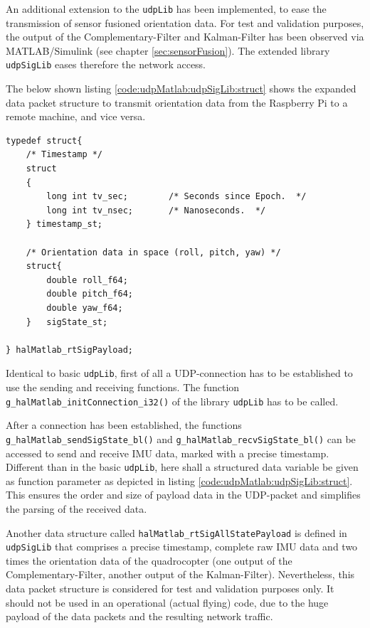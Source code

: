 An additional extension to the \texttt{udpLib} has been implemented, to ease the transmission of sensor fusioned orientation data. For test and validation purposes, the output of the Complementary-Filter and Kalman-Filter has been observed via MATLAB/Simulink (see chapter \ref{sec:sensorFusion}). The extended library \texttt{udpSigLib} eases therefore the network access.

The below shown listing \ref{code:udpMatlab:udpSigLib:struct} shows the expanded data packet structure to transmit orientation data from the Raspberry Pi to a remote machine, and vice versa.

\begin{lstlisting}[caption=C-Code snippet of the expanded Orientation data packet structure,label=code:udpMatlab:udpSigLib:struct]
typedef struct{
	/* Timestamp */
	struct
	{
		long int tv_sec;		/* Seconds since Epoch.  */
		long int tv_nsec;		/* Nanoseconds.  */
	} timestamp_st;
	
	/* Orientation data in space (roll, pitch, yaw) */
	struct{
		double roll_f64;
		double pitch_f64;
		double yaw_f64;
	}	sigState_st;
	
} halMatlab_rtSigPayload;
\end{lstlisting}

Identical to basic \texttt{udpLib}, first of all a UDP-connection has to be established to use the sending and receiving functions. The function \texttt{g\_halMatlab\_initConnection\_i32()} of the library \texttt{udpLib} has to be called.

After a connection has been established, the functions \texttt{g\_halMatlab\_sendSigState\_bl()} and \texttt{g\_halMatlab\_recvSigState\_bl()} can be accessed to send and receive IMU data, marked with a precise timestamp. Different than in the basic \texttt{udpLib}, here shall a structured data variable be given as function parameter as depicted in listing \ref{code:udpMatlab:udpSigLib:struct}. This ensures the order and size of payload data in the UDP-packet and simplifies the parsing of the received data.

Another data structure called \texttt{halMatlab\_rtSigAllStatePayload} is defined in \texttt{udpSigLib} that comprises a precise timestamp, complete raw IMU data and two times the orientation data of the quadrocopter (one output of the Complementary-Filter, another output of the Kalman-Filter). Nevertheless, this data packet structure is considered for test and validation purposes only. It should not be used in an operational (actual flying) code, due to the huge payload of the data packets and the resulting network traffic.

